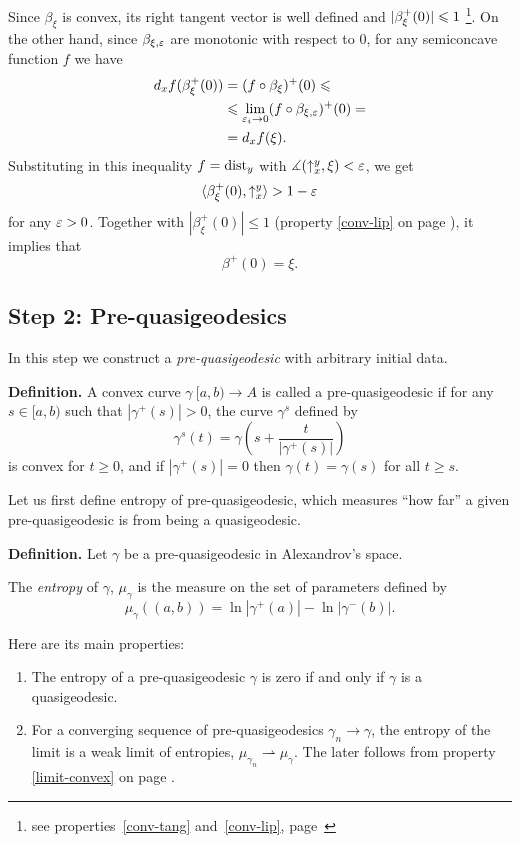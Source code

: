 \documentclass{article}
\begin{document}
Since $\beta_\xi$ is convex, its right tangent vector is well defined and
$|\beta^+_\xi(0)|\z\le 1$%
\footnote{see properties~\ref{conv-tang}
and~\ref{conv-lip}, page~\pageref{conv-tang}}.
On the other hand, since $\beta_{\xi,\varepsilon}$ are monotonic with respect to $0$, for any semiconcave function $f$
we have 
\begin{align*}
d_x f(\beta^+_{\xi}(0))
&=
(f\circ\beta_{\xi})^+(0)\leqslant
\\
&\leqslant
\lim_{\varepsilon_i\to0}(f\circ\beta_{\xi,\varepsilon})^+(0)=
\\
&=d_x f(\xi). \end{align*}
Substituting in this inequality $f=\operatorname{dist}_{y}$ with
$\measuredangle(\uparrow_x^{y},\xi)<\varepsilon$, we get $$\langle\beta^+_\xi(0),\uparrow_x^{y}\rangle  >
 1-\varepsilon$$
for any $\varepsilon>0$. 
Together with $|\beta^+_\xi(0)|\le 1$ (property \ref{conv-lip} on page
\pageref{conv-lip}), it implies that 
$$\beta^+(0)=\xi.$$
\qedsf











\subsection{Step 2: Pre-quasigeodesics} \label{step2}

In this step we construct a
\emph{pre-quasigeodesic} with arbitrary initial data.


\begin{thm}{\bf Definition.} 
A convex curve $\gamma\:[a,b) \rightarrow A$ is called a pre-quasigeodesic if for
any $s\in [a,b)$ such that ${|\gamma^+(s)|}>0$, the curve $\gamma^s$ defined by
$$\gamma^s(t)=\gamma\left(s+\frac{t}{|\gamma^+(s)|}\right)$$
is convex for $t\ge0$, and if ${|\gamma^+(s)|}=0$ then $\gamma(t)=\gamma(s)$ for
all $t\ge s$.
\end{thm}

Let us first define entropy of pre-quasigeodesic, which measures ``how far'' a given
pre-quasigeodesic is from being a quasigeodesic.

\begin{thm}{\bf Definition.}\label{def:entropy}
Let $\gamma$ be a pre-quasigeodesic in Alexandrov's space.

The \emph{entropy} of $\gamma$, $\mu_\gamma$ is the measure on the set of parameters
defined by
$$ \mu_\gamma ((a,b))=\ln |\gamma^+(a)|-\ln |\gamma^-(b)|.$$
\end{thm}
\noi Here are its main properties:
\begin{enumerate}
\item The entropy of a pre-quasigeodesic $\gamma$ is zero if and only if $\gamma$
is a quasigeodesic. 
\item\label{lim-entropy} For a converging sequence of pre-quasigeodesics
$\gamma_n\to \gamma$, the entropy of the limit is a weak limit of entropies,
$\mu_{\gamma_n}\rightharpoonup\mu_\gamma$. 
The later follows from property \ref{limit-convex} on page \pageref{limit-convex}. 
\end{enumerate}
\end{document}
